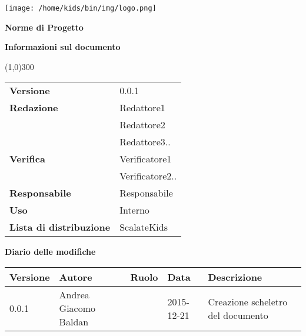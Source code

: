 \documentclass{scalatekids-article}
\begin{document}
\begin{titlepage}
  \centering
  \texttt{[image: /home/kids/bin/img/logo.png]}\par\vspace{1cm}
  \vspace{1.5cm}
         {\Huge\bfseries Norme di Progetto \par}
         \begin{center}
           \vspace{1.0cm}
                  {\large\bfseries Informazioni sul documento \par}
         \end{center}
         \vspace{-1cm}
         \begin{center}
           \line(1,0){300}
         \end{center}
         \vspace{0cm}
         \begin{tabular}[c]{l|l}
           \textbf{Versione} & 0.0.1\\
           \textbf{Redazione} & Redattore1\\ & Redattore2\\ & Redattore3..\\
           \textbf{Verifica} & Verificatore1\\ & Verificatore2..\\
           \textbf{Responsabile} & Responsabile\\
           \textbf{Uso} & Interno\\
           \textbf{Lista di distribuzione} & ScalateKids
         \end{tabular}
\end{titlepage}
\clearpage
\setcounter{page}{1}
\begin{flushleft}
  \vspace{0cm}
         {\large\bfseries Diario delle modifiche \par}
\end{flushleft}
\vspace{0cm}
\begin{center}
  \begin{tabular}{|l | l | l | l | l |}
    \hline
    Versione & Autore & Ruolo & Data & Descrizione \\
    \hline
    0.0.1 & Andrea Giacomo Baldan & & 2015-12-21 & Creazione scheletro del documento\\
    \hline
  \end{tabular}
\end{center}
\tableofcontents
\end{document}

